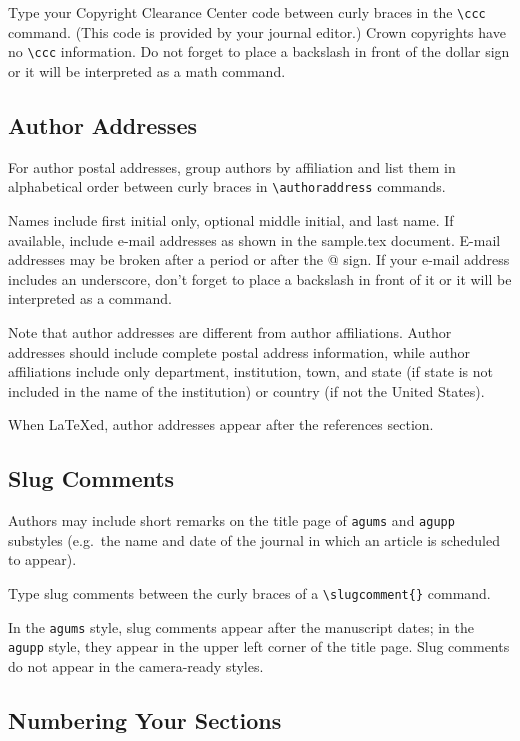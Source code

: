 \begin{article}
Type your Copyright Clearance Center code between
curly braces in the \verb"\ccc" command.  (This
code is provided by your journal editor.)  Crown 
copyrights have no \verb"\ccc" information.  Do not 
forget to place a backslash in front of the dollar
sign or it will be interpreted as a math command.


\subsection{Author Addresses}

For author postal addresses, group authors by affiliation 
and list them in alphabetical order between curly braces 
in \verb"\authoraddress" commands.

Names include first initial only, optional middle initial, 
and last name.  If available, include e-mail addresses as 
shown in the sample.tex document.  E-mail addresses may be 
broken after a period or after the @ sign.  If your e-mail 
address includes an underscore, don't forget to place a 
backslash in front of it or it will be interpreted as a 
command.

Note that author addresses are different from author
affiliations.  Author addresses should include complete
postal address information, while author affiliations
include only department, institution, town, and state
(if state is not included in the name of the institution)
or country (if not the United States).

When {\LaTeX}ed, author addresses appear after the
references section.


\subsection{Slug Comments}

Authors may include short remarks on the title page 
of {\tt agums} and {\tt agupp} substyles (e.g.\ the 
name and date of the journal in which an article 
is scheduled to appear).

Type slug comments between the curly braces of a
\verb"\slugcomment{}" command.

In the {\tt agums} style, slug comments appear after 
the manuscript dates; in the {\tt agupp} style, they 
appear in the upper left corner of the title page.
Slug comments do not appear in the camera-ready styles.


\subsection{Numbering Your Sections}\label{numbring}


\end{article}
